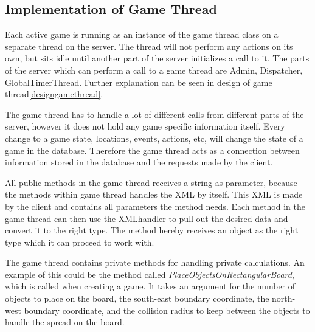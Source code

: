 \subsection{Implementation of Game Thread}
\label{sec:gamethreadimpl}
Each active game is running as an instance of the game thread class on a separate thread on the server. The thread will not perform any actions on its own, but sits idle until another part of the server initializes a call to it. The parts of the server which can perform a call to a game thread are Admin, Dispatcher, GlobalTimerThread. Further explanation can be seen in design of game thread\ref{designgamethread}. 

The game thread has to handle a lot of different calls from different parts of the server, however it does not hold any game specific information itself. Every change to a game state, locations, events, actions, etc, will change the state of a game in the database. Therefore the game thread acts as a connection between information stored in the database and the requests made by the client.

All public methods in the game thread receives a string as parameter, because the methods within game thread handles the XML by itself. This XML is made by the client and contains all parameters the method needs. Each method in the game thread can then use the XMLhandler to pull out the desired data and convert it to the right type. The method hereby receives an object as the right type which it can proceed to work with.

The game thread contains private methods for handling private calculations. An example of this could be the method called \textit{PlaceObjectsOnRectangularBoard}, which is called when creating a game. It takes an argument for the number of objects to place on the board, the south-east boundary coordinate, the north-west boundary coordinate, and the collision radius to keep between the objects to handle the spread on the board. 


